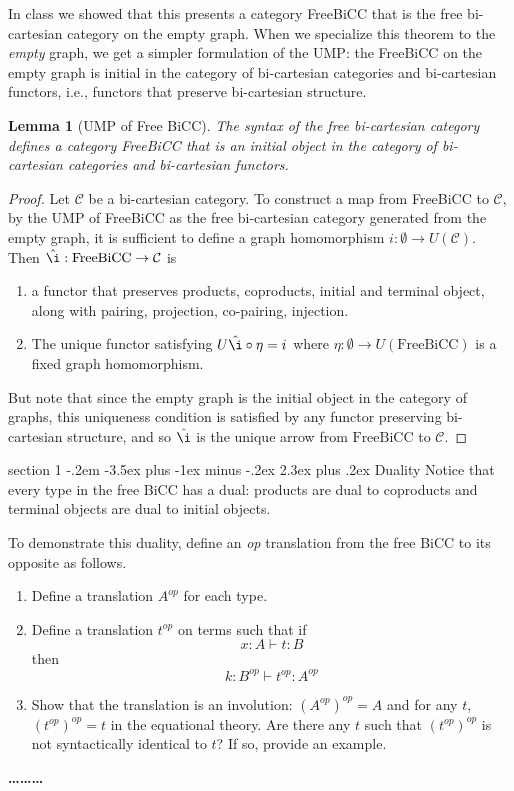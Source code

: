 \documentclass[12pt]{article}
\makeatletter
\newtheorem{lemma}{Lemma}
\newenvironment{problem}{\@startsection
       {section}
       {1}
       {-.2em}
       {-3.5ex plus -1ex minus -.2ex}
       {2.3ex plus .2ex}
       {\pagebreak[3]%
       \large\bf\noindent{Problem }
       }
       }
       {%
       \begin{center}\large\bf \ldots\ldots\ldots\end{center}}
\makeatother
\begin{document}
In class we showed that this presents a category FreeBiCC that is the
free bi-cartesian category on the empty graph. When we specialize this
theorem to the \emph{empty} graph, we get a simpler formulation of the
UMP: the FreeBiCC on the empty graph is initial in the category of
bi-cartesian categories and bi-cartesian functors, i.e., functors that
preserve bi-cartesian structure.
%
\begin{lemma}[UMP of Free BiCC]
  The syntax of the free bi-cartesian category defines a category
  FreeBiCC that is an initial object in the category of bi-cartesian
  categories and bi-cartesian functors.
\end{lemma}
\begin{proof}
  Let $\mathcal C$ be a bi-cartesian category. To construct a map from
  FreeBiCC to $\mathcal C$, by the UMP of FreeBiCC as the free
  bi-cartesian category generated from the empty graph, it is
  sufficient to define a graph homomorphism $i : \emptyset \to U(\mathcal
  C)$. Then $\hat \i : \textrm{FreeBiCC} \to \mathcal C$ is
  \begin{enumerate}
  \item a functor that preserves products, coproducts, initial and
    terminal object, along with pairing, projection, co-pairing,
    injection.
  \item The unique functor satisfying $U\hat \i \circ \eta = i$ where
    $\eta : \emptyset \to U(\textrm{FreeBiCC})$ is a fixed graph
    homomorphism.
  \end{enumerate}
  But note that since the empty graph is the initial object in the
  category of graphs, this uniqueness condition is satisfied by any
  functor preserving bi-cartesian structure, and so $\hat \i$ is the
  unique arrow from $\textrm{FreeBiCC}$ to $\mathcal C$.
\end{proof}

\begin{problem}{Duality}
  Notice that every type in the free BiCC has a dual: products are
  dual to coproducts and terminal objects are dual to initial objects.

  To demonstrate this duality, define an \emph{op} translation from
  the free BiCC to its opposite as follows.
  \begin{enumerate}
  \item Define a translation $A^{op}$ for each type.
  \item Define a translation $t^{op}$ on terms such that if
    \[ x : A \vdash t : B \]
    then
    \[ k: B^{op} \vdash t^{op} : A^{op} \]
  \item Show that the translation is an involution: $(A^{op})^{op} = A$
    and for any $t$, $(t^{op})^{op} = t$ in the equational theory. Are
    there any $t$ such that $(t^{op})^{op}$ is not syntactically
    identical to $t$? If so, provide an example.
  \end{enumerate}
\end{problem}
\end{document}
